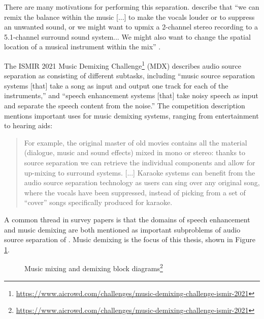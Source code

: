 \documentclass[report.tex]{subfiles}
\begin{document}
There are many motivations for performing this separation. \citeauthor{musicsepgood} describe that ``we can remix the balance within the music [...] to make the vocals louder or to suppress an unwanted sound, or we might want to upmix a 2-channel stereo recording to a 5.1-channel surround sound system... We might also want to change the spatial location of a musical instrument within the mix'' \parencite[31]{musicsepgood}.

The ISMIR 2021 Music Demixing Challenge\footnote{\url{https://www.aicrowd.com/challenges/music-demixing-challenge-ismir-2021}} (MDX) \parencite{mdx21} describes audio source separation as consisting of different subtasks, including ``music source separation systems [that] take a song as input and output one track for each of the instruments,'' and ``speech enhancement systems [that] take noisy speech as input and separate the speech content from the noise.'' The competition description mentions important uses for music demixing systems, ranging from entertainment to hearing aids:

\begin{quote}
	For example, the original master of old movies contains all the material (dialogue, music and sound effects) mixed in mono or stereo: thanks to source separation we can retrieve the individual components and allow for up-mixing to surround systems. [...] Karaoke systems can benefit from the audio source separation technology as users can sing over any original song, where the vocals have been suppressed, instead of picking from a set of ``cover'' songs specifically produced for karaoke.
\end{quote}

A common thread in survey papers is that the domains of speech enhancement and music demixing are both mentioned as important subproblems of audio source separation of \parencite{musicsepintro1, musicmask}. Music demixing is the focus of this thesis, shown in Figure \ref{fig:mixingdiagrams}.

\begin{figure}[ht]
	\centering
        \begin{minipage}{1.\textwidth}
		\renewcommand\footnoterule{} %
		\renewcommand{\thempfootnote}{\fnsymbol{mpfootnote}}
		\centering
		\caption[Music mixing and demixing block diagrams]{Music mixing and demixing block diagrams\footnote{\url{https://www.aicrowd.com/challenges/music-demixing-challenge-ismir-2021}}}
		\label{fig:mixingdiagrams}
	\end{minipage}
\end{figure}
\end{document}
